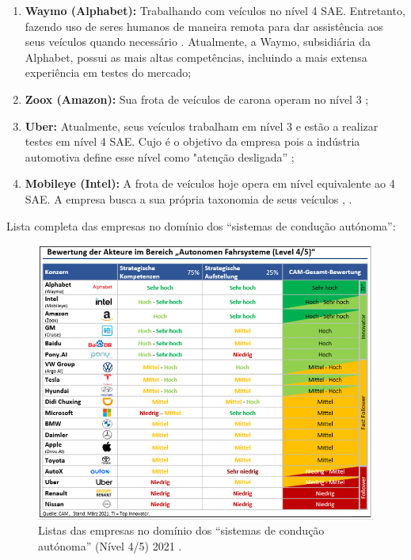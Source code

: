 \begin{enumerate}

   \item \textbf{Waymo (Alphabet):}
         Trabalhando com veículos no nível 4 SAE. Entretanto, fazendo uso de seres humanos de maneira remota para dar assistência aos seus veículos quando necessário \cite{waymo}. Atualmente, a Waymo, subsidiária da Alphabet, possui as mais altas competências, incluindo a mais extensa experiência em testes do mercado\cite{CAM};
   \item \textbf{Zoox (Amazon):}
         Sua frota de veículos de carona operam no nível 3 \cite{zoox};
   \item \textbf{Uber:}
         Atualmente, seus veículos trabalham em nível 3 e estão a realizar testes em nível 4 SAE. Cujo é o objetivo da empresa pois a indústria automotiva define esse nível como "atenção desligada” \cite{uber};
   \item \textbf{Mobileye (Intel):}
         A frota de veículos hoje opera em nível equivalente ao 4 SAE. A empresa busca a sua própria taxonomia de seus veículos \cite{mobileye}, \cite{mobileye1}.
\end{enumerate}

Lista completa das empresas no domínio dos “sistemas de condução autónoma”:


\begin{figure}[H]
\centering
\includegraphics[width=16cm]{Figures/grafik.png}
\caption{ Listas das empresas no domínio dos “sistemas de condução autónoma” (Nível 4/5) 2021 \cite{CAM}.}
\label{figura_companies}
\end{figure}

